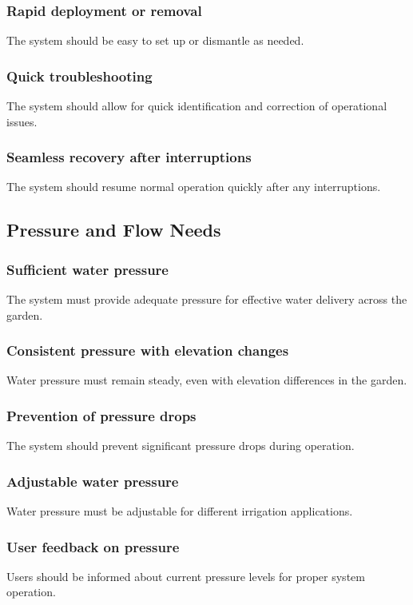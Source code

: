 \documentclass[12pt]{report}
\begin{document}
\subsubsection{Rapid deployment or removal}
The system should be easy to set up or dismantle as needed.

\subsubsection{Quick troubleshooting}
The system should allow for quick identification and correction of operational issues.

\subsubsection{Seamless recovery after interruptions}
The system should resume normal operation quickly after any interruptions.

\newpage
\subsection{Pressure and Flow Needs}

\subsubsection{Sufficient water pressure}
The system must provide adequate pressure for effective water delivery across the garden.

\subsubsection{Consistent pressure with elevation changes}
Water pressure must remain steady, even with elevation differences in the garden.

\subsubsection{Prevention of pressure drops}
The system should prevent significant pressure drops during operation.

\subsubsection{Adjustable water pressure}
Water pressure must be adjustable for different irrigation applications.

\subsubsection{User feedback on pressure}
Users should be informed about current pressure levels for proper system operation.
\end{document}
